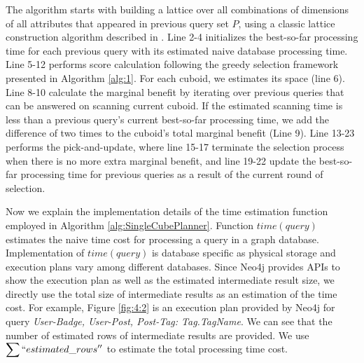 	
	The algorithm starts with building a lattice over all combinations of dimensions of all attributes that appeared in previous query set $P$, using a classic lattice construction algorithm described in \cite{DBLP:journals/ipl/NourineR99}. Line 2-4 initializes the best-so-far processing time for each previous query with its estimated naive database processing time. Line 5-12 performs score calculation following the greedy selection framework presented in Algorithm \ref{alg:1}. For each cuboid, we estimates its space (line 6). Line 8-10 calculate the marginal benefit by iterating over previous queries that can be answered on scanning current cuboid. If the estimated scanning time is less than a previous query's current best-so-far processing time, we add the difference of two times to the cuboid's total marginal benefit (Line 9). Line 13-23 performs the pick-and-update, where line 15-17 terminate the selection process when there is no more extra marginal benefit, and line 19-22 update the best-so-far processing time for previous queries as a result of the current round of selection.
	
	Now we explain the implementation details of the time estimation function employed in Algorithm \ref{alg:SingleCubePlanner}.
	Function \textbf{$time(query)$} estimates the naive time cost for processing a query in a graph database. Implementation of $time(query)$ is database specific as physical storage and execution plans vary among different databases. Since Neo4j provides APIs to show the execution plan as well as the estimated intermediate result size, we directly use the total size of intermediate results as an estimation of the time cost. For example, Figure \ref{fig:4:2} is an execution plan provided by Neo4j for query \textit{User-Badge, User-Post, Post-Tag: Tag.TagName}. We can see that the number of estimated rows of intermediate results are provided. We use $\displaystyle{\sum ``estimated\_rows''}$ to estimate the total processing time cost.
	
